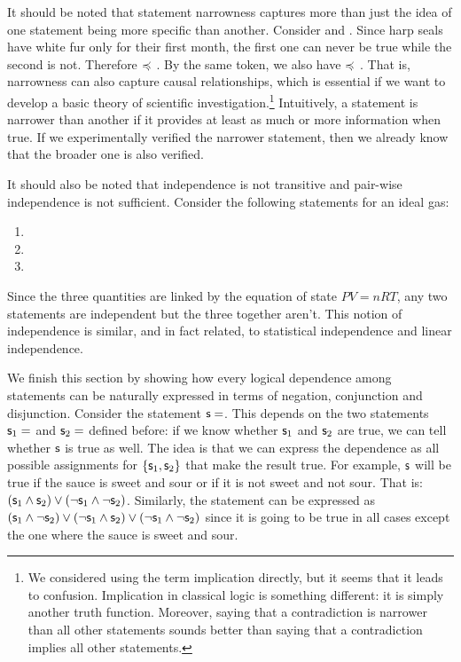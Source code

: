 \documentclass[11pt,letterpaper,fleqn]{memoir} %
\begin{document}
It should be noted that statement narrowness captures more than just the idea of one statement being more specific than another. Consider  and . Since harp seals have white fur only for their first month, the first one can never be true while the second is not. Therefore  $\preccurlyeq$ . By the same token, we also have  $\preccurlyeq$ . That is, narrowness can also capture causal relationships, which is essential if we want to develop a basic theory of scientific investigation.\footnote{We considered using the term implication directly, but it seems that it leads to confusion. Implication in classical logic is something different: it is simply another truth function. Moreover, saying that a contradiction is narrower than all other statements sounds better than saying that a contradiction implies all other statements.} Intuitively, a statement is narrower than another if it provides at least as much or more information when true. If we experimentally verified the narrower statement, then we already know that the broader one is also verified.

It should also be noted that independence is not transitive and pair-wise independence is not sufficient. Consider the following statements for an ideal gas:
\begin{enumerate}
	\item {}
	\item {}
	\item {}
\end{enumerate}
Since the three quantities are linked by the equation of state $PV=nRT$, any two statements are independent but the three together aren't. This notion of independence is similar, and in fact related, to statistical independence and linear independence.

We finish this section by showing how every logical dependence among statements can be naturally expressed in terms of negation, conjunction and disjunction. Consider the statement $\mathsf{s}=$. This depends on the two statements $\mathsf{s}_1=$ and $\mathsf{s}_2=$ defined before: if we know whether $\mathsf{s}_1$ and $\mathsf{s}_2$ are true, we can tell whether $\mathsf{s}$ is true as well. The idea is that we can express the dependence as all possible assignments for $\{\mathsf{s}_1, \mathsf{s}_2 \}$ that make the result true. For example, $\mathsf{s}$ will be true if the sauce is sweet and sour or if it is not sweet and not sour. That is: $(\mathsf{s}_1 \wedge \mathsf{s}_2) \vee (\neg \mathsf{s}_1 \wedge \neg \mathsf{s}_2)$. Similarly, the statement  can be expressed as $(\mathsf{s}_1 \wedge \neg \mathsf{s}_2) \vee (\neg \mathsf{s}_1 \wedge \mathsf{s}_2) \vee (\neg \mathsf{s}_1 \wedge \neg \mathsf{s}_2)$ since it is going to be true in all cases except the one where the sauce is sweet and sour.
\end{document}

